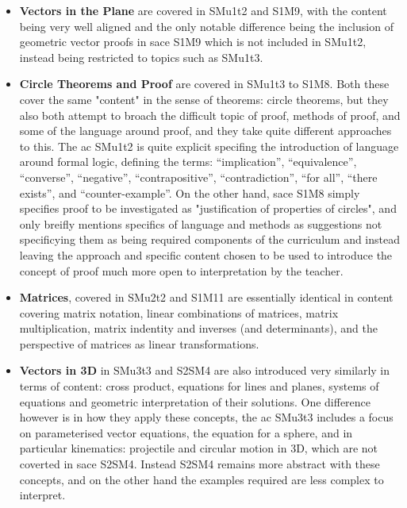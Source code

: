 \documentclass[twoside,12pt,a4paper]{report}
\begin{document}
\begin{itemize}
	\item \textbf{Vectors in the Plane} are covered in SMu1t2 and S1M9, with the content being very well aligned and the only notable difference being the inclusion of geometric vector proofs in \gls{sace} S1M9 which is not included in SMu1t2, instead being restricted to topics such as SMu1t3.
	\item \textbf{Circle Theorems and Proof} are covered in SMu1t3 to S1M8. Both these cover the same "content" in the sense of theorems: circle theorems, but they also both attempt to broach the difficult topic of proof, methods of proof, and some of the language around proof, and they take quite different approaches to this. The \gls{ac} SMu1t2 is quite explicit specifing the introduction of language around formal logic, defining the terms: ``implication'', ``equivalence'', ``converse'', ``negative'', ``contrapositive'', ``contradiction'', ``for all'', ``there exists'', and ``counter-example''. On the other hand, \gls{sace} S1M8 simply specifies proof to be investigated as "justification of properties of circles", and only breifly mentions specifics of language and methods as suggestions not specificying them as being required components of the curriculum and instead leaving the approach and specific content chosen to be used to introduce the concept of proof much more open to interpretation by the teacher.
	\item \textbf{Matrices}, covered in SMu2t2 and S1M11 are essentially identical in content covering matrix notation, linear combinations of matrices, matrix multiplication, matrix indentity and inverses (and determinants), and the perspective of matrices as linear transformations. 
	\item \textbf{Vectors in 3D} in SMu3t3 and S2SM4 are also introduced very similarly in terms of content: cross product, equations for lines and planes, systems of equations and geometric interpretation of their solutions.  One difference however is in how they apply these concepts, the \gls{ac} SMu3t3 includes a focus on parameterised vector equations, the equation for a sphere, and in particular kinematics: projectile and circular motion in 3D, which are not coverted in \gls{sace} S2SM4. Instead S2SM4 remains more abstract with these concepts, and on the other hand the examples required are less complex to interpret. 
\end{itemize}
\end{document}

